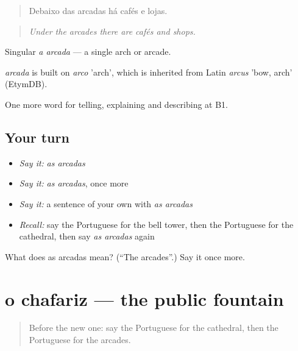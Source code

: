 \begin{quote}
Debaixo das arcadas há cafés e lojas.
\end{quote}

\begin{quote}
\emph{Under the arcades there are cafés and shops.}
\end{quote}

Singular \emph{a arcada} — a single arch or arcade.

\begin{cousinweb}
\emph{arcada} is built on \emph{arco} 'arch', which is inherited from Latin \emph{arcus} 'bow, arch' (EtymDB).
\end{cousinweb}

\begin{grammarlens}[title={What you've built}]
One more word for telling, explaining and describing at B1.
\end{grammarlens}

\subsection*{Your turn}
\begin{itemize}
\raggedright
  \item \emph{Say it:} \emph{as arcadas}
  \item \emph{Say it:} \emph{as arcadas}, once more
  \item \emph{Say it:} a sentence of your own with \emph{as arcadas}
  \item \emph{Recall:} say the Portuguese for the bell tower, then the Portuguese for the cathedral, then say \emph{as arcadas} again
\end{itemize}

\begin{tcolorbox}[breakable,colback=teal!4,colframe=teal!35!black,title={Before you move on}]
What does as arcadas mean? (\textquotedblleft{}The arcades\textquotedblright{}.) Say it once more.
\end{tcolorbox}
\section[o chafariz]{o chafariz — the public fountain}

\label{lesson:PT-C441-chafariz}



\begin{quote}
Before the new one: say the Portuguese for the cathedral, then the Portuguese for the arcades.
\end{quote}

